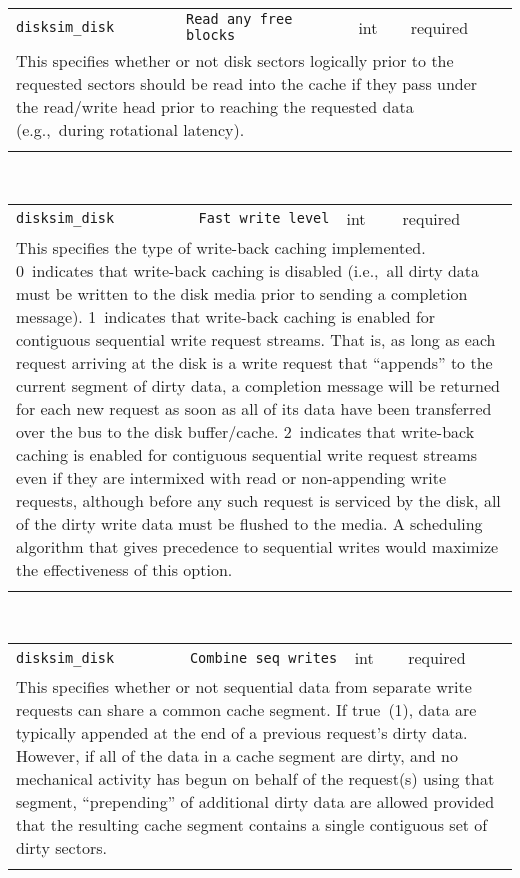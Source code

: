 \noindent 
\begin{tabular}{|p{\lpmodwidth}|p{\lpnamewidth}|p{0.5in}|p{0.5in}|}
\cline{1-4}
\texttt{disksim\_disk} & \texttt{Read any free blocks} & int & required \\ 
\cline{1-4}
\multicolumn{4}{|p{6in}|}{
This specifies whether or not disk sectors logically prior to the
requested sectors should be read into the cache if they pass under the
read/write head prior to reaching the requested data (e.g.,~during
rotational latency).
}\\ 
\cline{1-4}
\multicolumn{4}{p{5in}}{}\\
\end{tabular}\\ 
\noindent 
\begin{tabular}{|p{\lpmodwidth}|p{\lpnamewidth}|p{0.5in}|p{0.5in}|}
\cline{1-4}
\texttt{disksim\_disk} & \texttt{Fast write level} & int & required \\ 
\cline{1-4}
\multicolumn{4}{|p{6in}|}{
This specifies the type of write-back caching implemented.
0~indicates that write-back caching is disabled (i.e.,~all dirty data
must be written to the disk media prior to sending a completion
message).
1~indicates that write-back caching is enabled for contiguous
sequential write request streams. That is, as long as each request
arriving at the disk is a write request that ``appends'' to the
current segment of dirty data, a completion message will be returned
for each new request as soon as all of its data have been transferred
over the bus to the disk buffer/cache.
2~indicates that write-back caching is enabled for contiguous
sequential write request streams even if they are intermixed with read
or non-appending write requests, although before any such request is
serviced by the disk, all of the dirty write data must be flushed to
the media. A scheduling algorithm that gives precedence to sequential
writes would maximize the effectiveness of this option.
}\\ 
\cline{1-4}
\multicolumn{4}{p{5in}}{}\\
\end{tabular}\\ 
\noindent 
\begin{tabular}{|p{\lpmodwidth}|p{\lpnamewidth}|p{0.5in}|p{0.5in}|}
\cline{1-4}
\texttt{disksim\_disk} & \texttt{Combine seq writes} & int & required \\ 
\cline{1-4}
\multicolumn{4}{|p{6in}|}{
This specifies whether or not sequential data from separate write requests
can share a common cache segment. If true~(1), data are typically
appended at the end of a previous request's dirty data. However, if
all of the data in a cache segment are dirty, and no mechanical
activity has begun on behalf of the request(s) using that segment,
``prepending'' of additional dirty data are allowed provided that the
resulting cache segment contains a single contiguous set of dirty
sectors.
}\\ 
\cline{1-4}
\multicolumn{4}{p{5in}}{}\\
\end{tabular}\\ 
